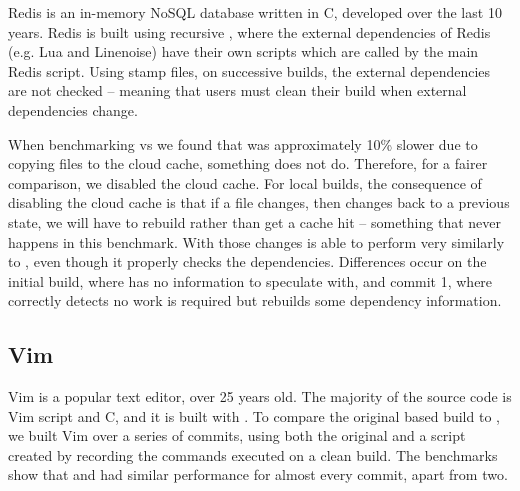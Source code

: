 Redis is an in-memory NoSQL database written in C, developed over the last 10 years. Redis is built using recursive \Make \cite{miller:recursive_make}, where the external dependencies of Redis (e.g. Lua and Linenoise) have their own \Make scripts which are called by the main Redis \Make script. Using stamp files, on successive builds, the external dependencies are not checked -- meaning that users must clean their build when external dependencies change.

When benchmarking \Rattle vs \Make we found that \Rattle was approximately 10\% slower due to copying files to the cloud cache, something \Make does not do. Therefore, for a fairer comparison, we disabled the cloud cache. For local builds, the consequence of disabling the cloud cache is that if a file changes, then changes back to a previous state, we will have to rebuild rather than get a cache hit -- something that never happens in this benchmark. With those changes \Rattle is able to perform very similarly to \Make, even though it properly checks the dependencies. Differences occur on the initial build, where \Rattle has no information to speculate with, and commit 1, where \Rattle correctly detects no work is required but \Make rebuilds some dependency information.

\subsection{Vim}
\label{sec:eval:vim}


Vim is a popular text editor, over 25 years old. The majority of the source code is Vim script and C, and it is built with \Make. To compare the original \Make based build to \Rattle, we built Vim over a series of commits, using both the original \Make and a \Rattle script created by recording the commands \Make executed on a clean build. The benchmarks show that \Make and \Rattle had similar performance for almost every commit, apart from two.

